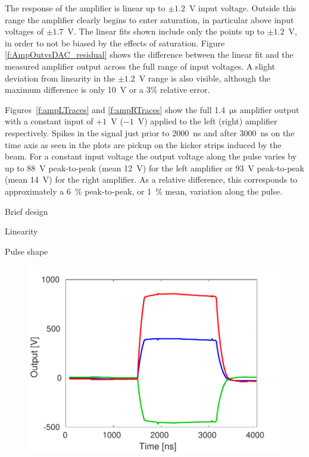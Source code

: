 \documentclass[%
 reprint,
 superscriptaddress,
 amsmath,
 amssymb,
 prstab,
]{revtex4-1}
\begin{document}
The response of the amplifier is linear up to \(\pm1.2\)~V input voltage. 
Outside this range the amplifier clearly begins to enter saturation, in 
particular above input voltages of \(\pm1.7\)~V. The linear fits shown include 
only the points up to \(\pm1.2\)~V, in order to not be biased by the effects of 
saturation. Figure \ref{f:AmpOutvsDAC_residual} shows the difference between 
the linear fit and the measured amplifier output across the full range of input 
voltages. A slight deviation from linearity in the \(\pm1.2\)~V range is also 
visible, although the maximum difference is only 10~V or a 3\% relative error.

Figures~\ref{f:ampLTraces} and \ref{f:ampRTraces} show the full 
1.4~\(\mathrm{\mu}\)s amplifier output with a constant input of \(+1\)~V 
(\(-1\)~V) applied to the left (right) amplifier respectively. Spikes in the 
signal just prior to 2000~ns and after 3000~ns on the time axis as seen in the 
plots are pickup on the kicker strips induced by the beam. For a constant input 
voltage the output voltage along the pulse varies by up to 88~V peak-to-peak 
(mean 12~V) for the left amplifier or 93~V peak-to-peak (mean 14~V) for the 
right amplifier. As a relative difference, this corresponds to approximately a 
6~\% peak-to-peak, or 1~\% mean, variation along the pulse.

Brief design

Linearity

Pulse shape

\begin{figure}
	\includegraphics[width=\columnwidth]{figs/hw/AmpL_Traces}%
	\caption{\label{f:AmpL_Traces}
	}
\end{figure}
\end{document}
